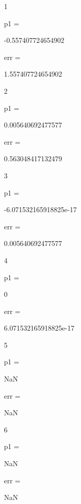      1


p1 =

  -0.557407724654902


err =

   1.557407724654902

     2


p1 =

   0.005640692477577


err =

   0.563048417132479

     3


p1 =

    -6.071532165918825e-17


err =

   0.005640692477577

     4


p1 =

     0


err =

     6.071532165918825e-17

     5


p1 =

   NaN


err =

   NaN

     6


p1 =

   NaN


err =

   NaN





